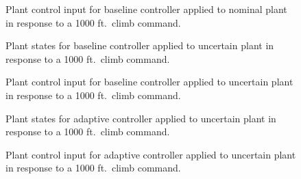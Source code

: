 \newpage
\begin{figure}[H]
  \hspace{-0.5in}
  \noindent{}
  \vspace{-1.0in}
  \caption{Plant control input for baseline controller applied to nominal plant in response to a 1000 ft.\ climb command.\label{fig.baselineNominalLongControl}}
\end{figure}

\newpage
\begin{figure}[H]
  \hspace{-0.5in}
  \noindent{}
  \vspace{-1.0in}
  \caption{Plant states for baseline controller applied to uncertain plant in response to a 1000 ft.\ climb command.\label{fig.baselineUncertainLongState}}
\end{figure}

\newpage
\begin{figure}[H]
  \hspace{-0.5in}
  \noindent{}
  \vspace{-1.0in}
  \caption{Plant control input for baseline controller applied to uncertain plant in response to a 1000 ft.\ climb command.\label{fig.baselineUncertainLongControl}}
\end{figure}

\newpage
\begin{figure}[H]
  \hspace{-0.5in}
  \noindent{}
  \vspace{-1.0in}
  \caption{Plant states for adaptive controller applied to uncertain plant in response to a 1000 ft.\ climb command.\label{fig.adaptiveUncertainLongState}}
\end{figure}

\newpage
\begin{figure}[H]
  \hspace{-0.5in}
  \noindent{}
  \vspace{-1.0in}
  \caption{Plant control input for adaptive controller applied to uncertain plant in response to a 1000 ft.\ climb command.\label{fig.adaptiveUncertainLongControl}}
\end{figure}

